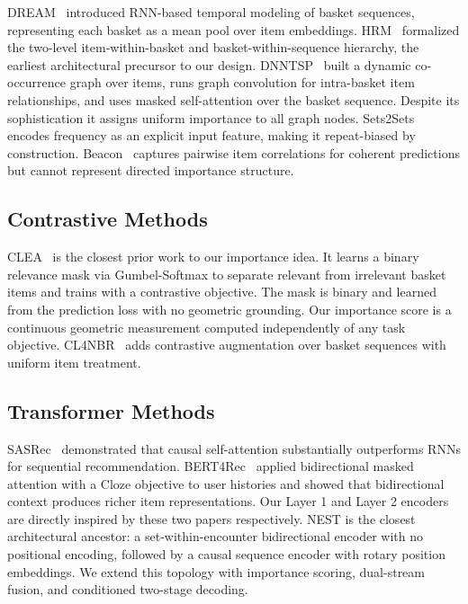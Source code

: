 \documentclass[conference]{IEEEtran}
\begin{document}
DREAM~\cite{yu2016dynamic} introduced RNN-based temporal modeling of
basket sequences, representing each basket as a mean pool over item
embeddings. HRM~\cite{wang2015learning} formalized the two-level
item-within-basket and basket-within-sequence hierarchy, the earliest
architectural precursor to our design. DNNTSP~\cite{yu2020predicting}
built a dynamic co-occurrence graph over items, runs graph convolution
for intra-basket item relationships, and uses masked self-attention over
the basket sequence. Despite its sophistication it assigns uniform
importance to all graph nodes. Sets2Sets~\cite{hu2019sets2sets} encodes
frequency as an explicit input feature, making it repeat-biased by
construction. Beacon~\cite{le2019correlation} captures pairwise item
correlations for coherent predictions but cannot represent directed
importance structure.

\subsection{Contrastive Methods}

CLEA~\cite{qin2021world} is the closest prior work to our importance
idea. It learns a binary relevance mask via Gumbel-Softmax to separate
relevant from irrelevant basket items and trains with a contrastive
objective. The mask is binary and learned from the prediction loss with
no geometric grounding. Our importance score is a continuous geometric
measurement computed independently of any task objective.
CL4NBR~\cite{zhu2025contrastive} adds contrastive augmentation over basket
sequences with uniform item treatment.

\subsection{Transformer Methods}

SASRec~\cite{kang2018self} demonstrated that causal self-attention
substantially outperforms RNNs for sequential recommendation.
BERT4Rec~\cite{sun2019bert4rec} applied bidirectional masked attention
with a Cloze objective to user histories and showed that bidirectional
context produces richer item representations. Our Layer 1 and Layer 2
encoders are directly inspired by these two papers respectively.
NEST is the closest architectural ancestor:
a set-within-encounter bidirectional encoder with no positional
encoding, followed by a causal sequence encoder with rotary position
embeddings. We extend this topology with importance scoring,
dual-stream fusion, and conditioned two-stage decoding.
\end{document}
